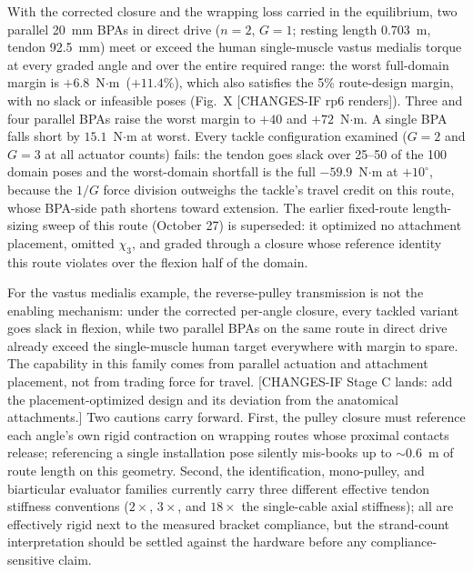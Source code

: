 \begin{results}
With the corrected closure and the wrapping loss carried in the
equilibrium, two parallel 20~mm BPAs in direct drive ($n=2$, $G=1$;
resting length 0.703~m, tendon 92.5~mm) meet or exceed the human
single-muscle vastus medialis torque at every graded angle and over the
entire required range: the worst full-domain margin is
$+6.8$~N$\cdot$m~($+11.4\%$), which also satisfies the 5\% route-design
margin, with no slack or infeasible poses (Fig.~X [CHANGES-IF rp6
renders]). Three and four parallel BPAs raise the worst margin to
$+40$ and $+72$~N$\cdot$m. A single BPA falls short by $15.1$~N$\cdot$m
at worst. Every tackle configuration examined ($G=2$ and $G=3$ at all
actuator counts) fails: the tendon goes slack over 25--50 of the 100
domain poses and the worst-domain shortfall is the full $-59.9$~N$\cdot$m
at $+10^{\circ}$, because the $1/G$ force division outweighs the
tackle's travel credit on this route, whose BPA-side path shortens
toward extension. The earlier fixed-route length-sizing sweep of this
route (October 27) is superseded: it optimized no attachment placement,
omitted $\chi_3$, and graded through a closure whose reference identity
this route violates over the flexion half of the domain.
\end{results}

\begin{discussion}
For the vastus medialis example, the reverse-pulley transmission is not
the enabling mechanism: under the corrected per-angle closure, every
tackled variant goes slack in flexion, while two parallel BPAs on the
same route in direct drive already exceed the single-muscle human target
everywhere with margin to spare. The capability in this family comes
from parallel actuation and attachment placement, not from trading force
for travel. [CHANGES-IF Stage C lands: add the placement-optimized
design and its deviation from the anatomical attachments.] Two cautions
carry forward. First, the pulley closure must reference each angle's own
rigid contraction on wrapping routes whose proximal contacts release;
referencing a single installation pose silently mis-books up to
$\sim$0.6~m of route length on this geometry. Second, the identification,
mono-pulley, and biarticular evaluator families currently carry three
different effective tendon stiffness conventions ($2\times$, $3\times$,
and $18\times$ the single-cable axial stiffness); all are effectively
rigid next to the measured bracket compliance, but the strand-count
interpretation should be settled against the hardware before any
compliance-sensitive claim.
\end{discussion}

